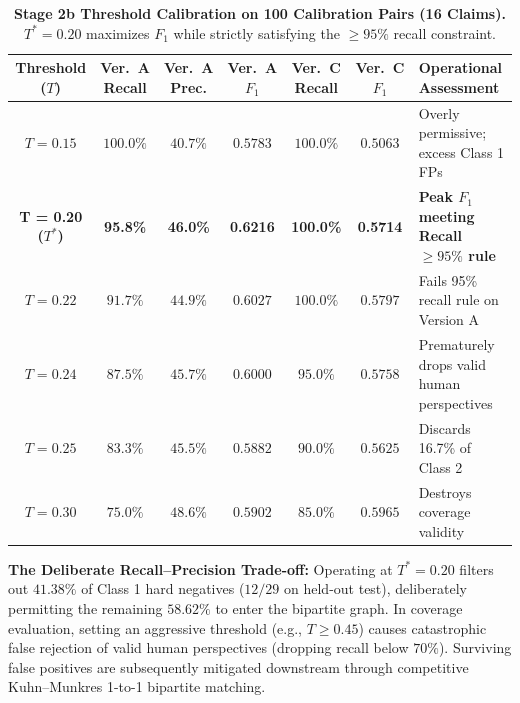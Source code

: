 \documentclass[11pt,a4paper]{article}
\begin{document}
\begin{table}[htbp]
\centering
\small
\caption{\textbf{Stage 2b Threshold Calibration on 100 Calibration Pairs (16 Claims).} $T^* = 0.20$ maximizes $F_1$ while strictly satisfying the $\ge 95\%$ recall constraint.}
\label{tab:stage2_sweep}
\begin{adjustbox}{max width=\linewidth}
\begin{tabular}{c c c c c c l}
\toprule
\makecell{\textbf{Threshold}\\\textbf{($T$)}} & \makecell{\textbf{Ver.~A}\\\textbf{Recall}} & \makecell{\textbf{Ver.~A}\\\textbf{Prec.}} & \makecell{\textbf{Ver.~A}\\\textbf{$F_1$}} & \makecell{\textbf{Ver.~C}\\\textbf{Recall}} & \makecell{\textbf{Ver.~C}\\\textbf{$F_1$}} & \textbf{Operational Assessment} \\
\midrule
$T = 0.15$ & $100.0\%$ & $40.7\%$ & $0.5783$ & $100.0\%$ & $0.5063$ & Overly permissive; excess Class 1 FPs \\
\textbf{T = 0.20 ($T^*$)} & \textbf{95.8\%} & \textbf{46.0\%} & \textbf{0.6216} & \textbf{100.0\%} & \textbf{0.5714} & \textbf{Peak $F_1$ meeting Recall $\ge 95\%$ rule} \\
$T = 0.22$ & $91.7\%$ & $44.9\%$ & $0.6027$ & $100.0\%$ & $0.5797$ & Fails 95\% recall rule on Version A \\
$T = 0.24$ & $87.5\%$ & $45.7\%$ & $0.6000$ & $95.0\%$ & $0.5758$ & Prematurely drops valid human perspectives \\
$T = 0.25$ & $83.3\%$ & $45.5\%$ & $0.5882$ & $90.0\%$ & $0.5625$ & Discards 16.7\% of Class 2 \\
$T = 0.30$ & $75.0\%$ & $48.6\%$ & $0.5902$ & $85.0\%$ & $0.5965$ & Destroys coverage validity \\
\bottomrule
\end{tabular}
\end{adjustbox}
\end{table}

\begin{tcolorbox}
\textbf{The Deliberate Recall--Precision Trade-off:} Operating at $T^* = 0.20$ filters out $41.38\%$ of Class 1 hard negatives ($12/29$ on held-out test), deliberately permitting the remaining $58.62\%$ to enter the bipartite graph. In coverage evaluation, setting an aggressive threshold (e.g., $T \ge 0.45$) causes catastrophic false rejection of valid human perspectives (dropping recall below $70\%$). Surviving false positives are subsequently mitigated downstream through competitive Kuhn--Munkres 1-to-1 bipartite matching.
\end{tcolorbox}
\end{document}
